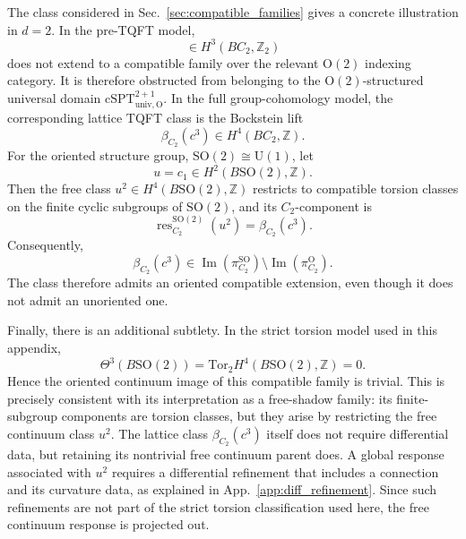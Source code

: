 \documentclass[aps,prx,reprint,superscriptaddress,twocolumn,amsmath,amssymb,amsfonts, nofootinbib]{revtex4-2}
\newcommand{\tor}{\text{Tor}}
\theoremstyle{apsstyle}
\begin{document}
The class considered in Sec.~\ref{sec:compatible_families} gives a
concrete illustration in $d=2$. In the pre-TQFT model,
\begin{equation*}
[c^3]\in H^3(BC_2,\mathbb Z_2)
\end{equation*}
does not extend to a compatible family over the relevant
$\mathrm O(2)$ indexing category. It is therefore obstructed from
belonging to the $\mathrm O(2)$-structured universal domain $\mathrm{cSPT}^{2+1}_{\mathrm{univ}, \mathrm{O}}$. In the full group-cohomology model, the corresponding lattice TQFT class is
the Bockstein lift
\begin{equation*}
\beta_{C_2}(c^3)
\in
H^4(BC_2,\mathbb Z).
\end{equation*}
For the oriented structure group, $\mathrm{SO}(2)\cong\mathrm U(1)$, let
\begin{equation*}
u=c_1
\in
H^2(B\mathrm{SO}(2),\mathbb Z).
\end{equation*}
Then the free class $u^2 \in H^4(B\mathrm{SO}(2),\mathbb Z)$ restricts to compatible torsion classes on the finite cyclic subgroups of $\mathrm{SO}(2)$, and its $C_2$-component is
\begin{equation}
\operatorname{res}^{\mathrm{SO}(2)}_{C_2}(u^2)
=
\beta_{C_2}(c^3).
\label{eq:C2_free_shadow_restriction}
\end{equation}
Consequently,
\begin{equation*}
\beta_{C_2}(c^3)
\in
\operatorname{Im}(\pi_{C_2}^{\mathrm{SO}})
\setminus
\operatorname{Im}(\pi_{C_2}^{\mathrm O}).
\end{equation*}
The class therefore admits an oriented compatible extension, even
though it does not admit an unoriented one.

Finally, there is an additional subtlety. In the strict torsion model used in
this appendix,
\begin{equation*}
\Theta^3(B\mathrm{SO}(2))
=
\tor_2
H^4(B\mathrm{SO}(2),\mathbb Z)
=
0.
\end{equation*}
Hence the oriented continuum image of this compatible family is
trivial. This is precisely consistent with its interpretation as a
free-shadow family: its finite-subgroup components are torsion
classes, but they arise by restricting the free continuum class
$u^2$. The lattice class $\beta_{C_2}(c^3)$ itself does not require
differential data, but retaining its nontrivial free continuum parent
does. A global response associated with $u^2$ requires a differential
refinement that includes a connection and its curvature data, as
explained in App.~\ref{app:diff_refinement}. Since such refinements are
not part of the strict torsion classification used here, the free
continuum response is projected out.
\end{document}
